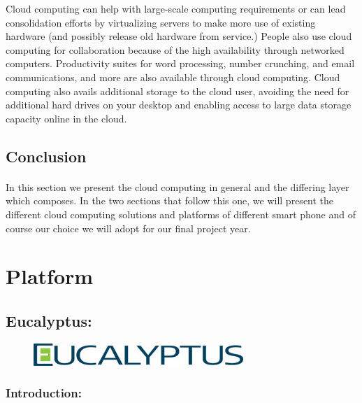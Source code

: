 Cloud computing can help with large-scale computing requirements or can lead consolidation efforts 
by virtualizing servers to make more use of existing hardware (and possibly release old hardware from service.) 
People also use cloud computing for collaboration because of the high availability through networked computers. 
Productivity suites for word processing, number crunching, and email communications, and more are also available through cloud computing.
 Cloud computing also avails additional storage to the cloud user, 
avoiding the need for additional hard drives on your desktop and enabling access to large data storage capacity online in the cloud.
 
\subsection{Conclusion}
\paragraph{} In this section we present the cloud computing in general and the differing layer which composes.
 In the two sections that follow this one, 
we will present the different cloud computing solutions and platforms of different smart phone 
and of course our choice we will adopt for our final project year.\par


\newpage
\section{Platform}
\subsection{Eucalyptus:}

\begin{figure}[!h]
  \center
  \includegraphics{./images/Eucalyptus-Logo.jpg}
  
\end{figure}

 



\subsubsection{Introduction:}


